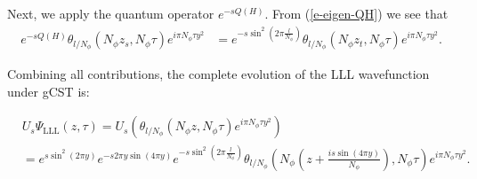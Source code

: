 \documentclass[a4paper,11pt]{article}
\begin{document}
Next, we apply the quantum operator $e^{-sQ(H)}$. 
From (\ref{e-eigen-QH}) we see that
\begin{align*}
e^{-sQ(H)}\theta_{l/N_{\phi}}(N_{\phi}z_{s},N_{\phi}\tau)e^{i\pi N_{\phi}\tau y^2}&= e^{-s \sin^2\left(2\pi\frac{l}{N_{\phi}}\right)}\theta_{l/N_{\phi}}(N_{\phi}z_{t},N_{\phi}\tau)e^{i\pi N_{\phi}\tau y^2}. 
\end{align*}

Combining all contributions, the complete evolution of the LLL wavefunction under gCST is:

\begin{align}
& U_{s}\Psi_{\mathrm{LLL}}(z,\tau) = U_{s}\left(\theta_{l/N_{\phi}}(N_{\phi}z,N_{\phi}\tau)e^{i\pi N_{\phi}\tau y^2}\right)\nonumber\\
\label{evolvedsingleparticlenonflat}
&= e^{s\sin^2{(2\pi y)}}e^{-s 2\pi y\sin{(4\pi y)}}e^{-s\sin^2{\left(2\pi\frac{l}{N_{\phi}}\right)}}\theta_{l/N_{\phi}}\left(N_{\phi}\left(z+\frac{is\sin{(4\pi y)}}{N_{\phi}}\right),N_{\phi}\tau\right)e^{i\pi N_{\phi}\tau y^2}. 
\end{align}
\end{document}
